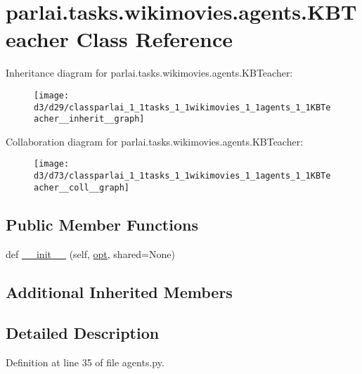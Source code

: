 \hypertarget{classparlai_1_1tasks_1_1wikimovies_1_1agents_1_1KBTeacher}{}\section{parlai.\+tasks.\+wikimovies.\+agents.\+K\+B\+Teacher Class Reference}
\label{classparlai_1_1tasks_1_1wikimovies_1_1agents_1_1KBTeacher}


Inheritance diagram for parlai.\+tasks.\+wikimovies.\+agents.\+K\+B\+Teacher\+:\nopagebreak
\begin{figure}[H]
\begin{center}
\leavevmode
\texttt{[image: d3/d29/classparlai\_1\_1tasks\_1\_1wikimovies\_1\_1agents\_1\_1KBTeacher\_\_inherit\_\_graph]}
\end{center}
\end{figure}


Collaboration diagram for parlai.\+tasks.\+wikimovies.\+agents.\+K\+B\+Teacher\+:\nopagebreak
\begin{figure}[H]
\begin{center}
\leavevmode
\texttt{[image: d3/d73/classparlai\_1\_1tasks\_1\_1wikimovies\_1\_1agents\_1\_1KBTeacher\_\_coll\_\_graph]}
\end{center}
\end{figure}
\subsection*{Public Member Functions}
\begin{DoxyCompactItemize}
\item 
def \hyperlink{classparlai_1_1tasks_1_1wikimovies_1_1agents_1_1KBTeacher_af07082cfcac7b822a87ed83493dae616}{\+\_\+\+\_\+init\+\_\+\+\_\+} (self, \hyperlink{classparlai_1_1core_1_1teachers_1_1FbDialogTeacher_af7a9ec497b9cd0292d7b8fa220da7c28}{opt}, shared=None)
\end{DoxyCompactItemize}
\subsection*{Additional Inherited Members}


\subsection{Detailed Description}


Definition at line 35 of file agents.\+py.



